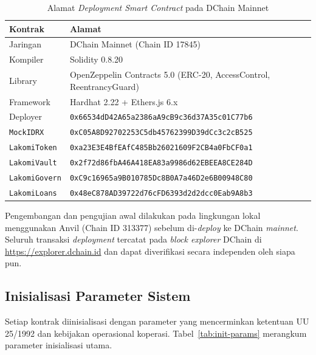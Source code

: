 \begin{table}[H]
\centering
\caption{Alamat \textit{Deployment Smart Contract} pada DChain Mainnet}
\label{tab:deployment}
\footnotesize
\begin{tabular}{p{}p{}}
\toprule
\textbf{Kontrak} & \textbf{Alamat} \\
\midrule
Jaringan & DChain Mainnet (Chain ID 17845) \\
Kompiler & Solidity 0.8.20 \\
Library & OpenZeppelin Contracts 5.0 (ERC-20, AccessControl, ReentrancyGuard) \\
Framework & Hardhat 2.22 + Ethers.js 6.x \\
Deployer & \texttt{0x66534dD42A65a2386aA9cB9c36d37A35c01C77b6} \\
\midrule
\texttt{MockIDRX} & \texttt{0xC05A8D92702253C5db45762399D39dCc3c2cB525} \\
\texttt{LakomiToken} & \texttt{0xa23E3E4BfEAfC485Bb26021609F2CB4a0FbCF0a1} \\
\texttt{LakomiVault} & \texttt{0x2f72d86fbA46A418EA83a9986d62EBEEA8CE284D} \\
\texttt{LakomiGovern} & \texttt{0xC9c16965a9B010785Dc8B0A7a46D2e6B00948C80} \\
\texttt{LakomiLoans} & \texttt{0x48eC878AD39722d76cFD6393d2d2dcc0Eab9A8b3} \\
\bottomrule
\end{tabular}
\end{table}

Pengembangan dan pengujian awal dilakukan pada lingkungan lokal menggunakan Anvil (Chain ID 313377) sebelum di-\textit{deploy} ke DChain \textit{mainnet}. Seluruh transaksi \textit{deployment} tercatat pada \textit{block explorer} DChain di \url{https://explorer.dchain.id} dan dapat diverifikasi secara independen oleh siapa pun.

\subsection{Inisialisasi Parameter Sistem}

Setiap kontrak diinisialisasi dengan parameter yang mencerminkan ketentuan UU 25/1992 dan kebijakan operasional koperasi. Tabel~\ref{tab:init-params} merangkum parameter inisialisasi utama.

